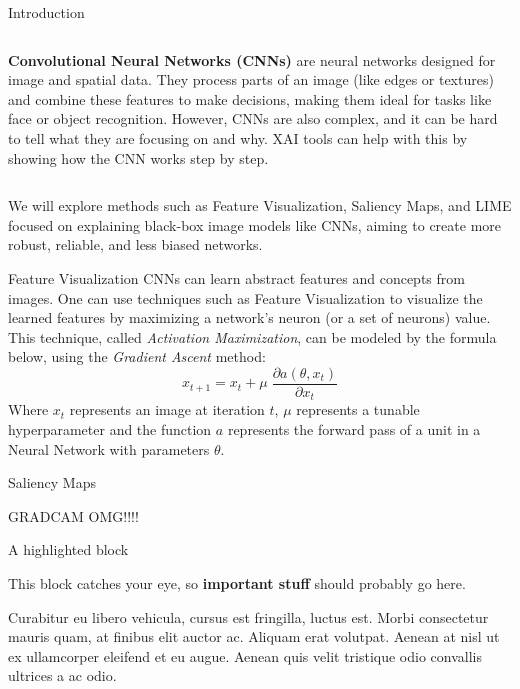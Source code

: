 \documentclass[final]{beamer}
\newlength{\colwidth}
\begin{document}
\begin{frame}[t]
\begin{columns}[t]
\begin{column}{\colwidth}
\begin{block}{Introduction}
\begin{columns}
      \begin{column}{0.4\textwidth}        
        
        \textbf{Convolutional Neural Networks (CNNs)} are neural networks designed for image and spatial data. They process parts of an image (like edges or textures) and combine these features to make decisions, making them ideal for tasks like face or object recognition.
        However, CNNs are also complex, and it can be hard to tell what they are focusing on and why. 
        XAI tools can help with this by showing how the CNN works step by step.
      \end{column}
    
    \end{columns}
    We will explore methods such as Feature Visualization, Saliency Maps, and LIME focused on explaining black-box image models like CNNs, aiming to create more robust, reliable, and less biased networks.
  \end{block}

  \begin{block}{Feature Visualization}
    CNNs can learn abstract features and concepts from images. 
    One can use techniques such as Feature Visualization to visualize the learned features by maximizing a network's neuron (or a set of neurons) value.
    This technique, called \emph{Activation Maximization}, can be modeled by the formula below, using the \emph{Gradient Ascent} method:
    \[x_{t + 1} = x_{t} + \mu \;\frac{\partial a(\theta, x_t)}{\partial x_t}\]
    Where \(x_t\) represents an image at iteration \(t\), \(\mu\) represents a tunable hyperparameter and the function \(a\) represents the forward pass of a unit in a Neural Network with parameters \(\theta\).
  \end{block}

  \begin{block}{Saliency Maps}

    GRADCAM OMG!!!!

  \end{block}

  \begin{alertblock}{A highlighted block}

    This block catches your eye, so \textbf{important stuff} should probably go
    here.

    Curabitur eu libero vehicula, cursus est fringilla, luctus est. Morbi
    consectetur mauris quam, at finibus elit auctor ac. Aliquam erat volutpat.
    Aenean at nisl ut ex ullamcorper eleifend et eu augue. Aenean quis velit
    tristique odio convallis ultrices a ac odio.
  \end{alertblock}


\end{column}
\end{columns}
\end{frame}
\end{document}
